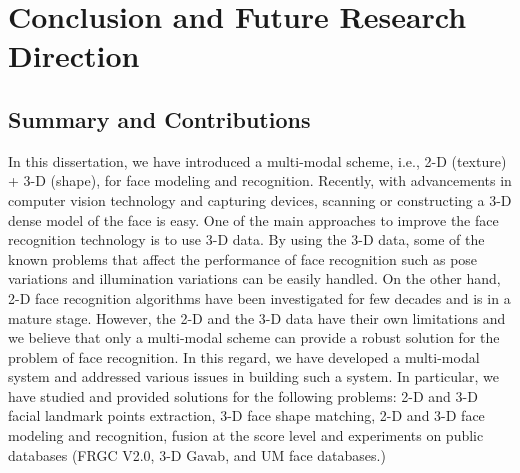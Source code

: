 \chapter{Conclusion and Future Research Direction}

\section{Summary and Contributions}
In this dissertation, we have introduced a multi-modal scheme, i.e.,
2-D (texture) + 3-D (shape), for face modeling and recognition.
Recently, with advancements in computer vision technology and
capturing devices, scanning or constructing a 3-D dense model of the
face is easy. One of the main approaches to improve the face
recognition technology is to use 3-D data. By using the 3-D data,
some of the known problems that affect the performance of face
recognition such as pose variations and illumination variations can
be easily handled. On the other hand, 2-D face recognition
algorithms have been investigated for few decades and is in a mature
stage. However, the 2-D and the 3-D data have their own limitations
and we believe that only a multi-modal scheme can provide a robust
solution for the problem of face recognition. In this regard, we
have developed a multi-modal system and addressed various issues in
building such a system. In particular, we have studied and provided
solutions for the following problems: 2-D and 3-D facial landmark
points extraction, 3-D face shape matching, 2-D and 3-D face
modeling and recognition, fusion at the score level and experiments
on public databases (FRGC V2.0, 3-D Gavab, and UM face databases.)


